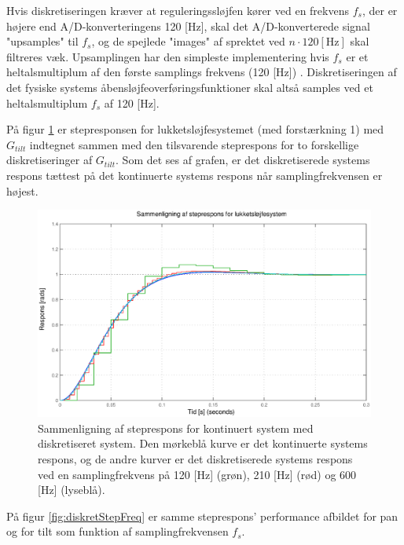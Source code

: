 Hvis diskretiseringen kræver at reguleringssløjfen kører ved en frekvens \(f_s\),
der er højere end A/D-konverteringens 120 [Hz], skal det A/D-konverterede
signal "upsamples" til \(f_s\), og de spejlede "images" af sprektet ved \(n\cdot{}120 \mathrm{\left[Hz\right]}\) skal filtreres væk.
Upsamplingen har den simpleste implementering
hvis \(f_s\) er et heltalsmultiplum af den første samplings frekvens (120 [Hz]) \citep{dsp}.
Diskretiseringen af det fysiske systems åbensløjfeoverføringsfunktioner skal altså samples ved et heltalsmultiplum \(f_s\) af 120 [Hz].

På figur \ref{fig:diskretTiltStep} er stepresponsen for lukketsløjfesystemet (med forstærkning 1)
med \(G_{tilt}\) indtegnet sammen med den tilsvarende steprespons for to forskellige diskretiseringer
af \(G_{tilt}\). Som det ses af grafen, er det diskretiserede systems respons tættest
på det kontinuerte systems respons når samplingfrekvensen er højest.
\begin{figure}[!th]
\centering
	\includegraphics[width=1\textwidth]{./graphics/diskretTiltStep.eps}
\caption[Sammenligning af steprespons for kontinuert system med diskretiseret system]
{Sammenligning af steprespons for kontinuert system med diskretiseret system.
Den mørkeblå kurve er det kontinuerte systems respons,
og de andre kurver er det diskretiserede systems respons ved en samplingfrekvens på
120 [Hz] (grøn), 210 [Hz] (rød) og 600 [Hz] (lyseblå).}
\label{fig:diskretTiltStep}
\end{figure}
På figur \ref{fig:diskretStepFreq} er samme steprespons' performance afbildet
for pan og for tilt som funktion af samplingfrekvensen \(f_s\).
